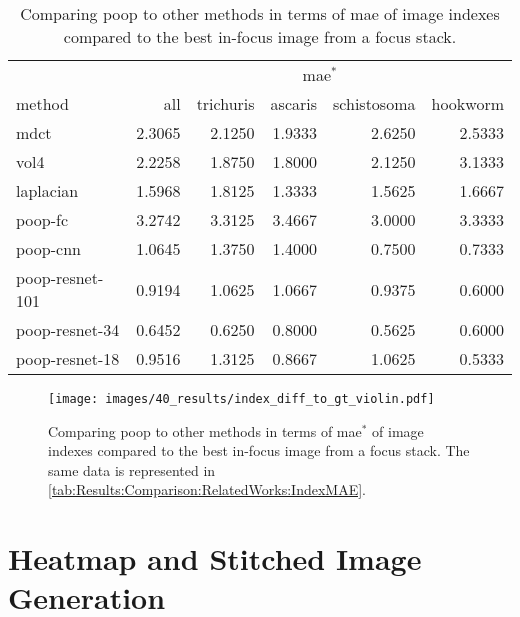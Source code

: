 \begin{table}
    \centering
    \caption{Comparing \acs{poop} to other methods in terms of \ac{mae} of image indexes compared to the best in-focus image from a focus stack.}
    \begin{tabular}{|l|rrrrr|}
        \hline
        \multicolumn{1}{|c}{} & \multicolumn{5}{|c|}{\ac{mae}$^*$} \\
        method & all & trichuris & ascaris & schistosoma & hookworm \\
        \hline
        \acs{mdct}      & 2.3065 & 2.1250 & 1.9333 & 2.6250 & 2.5333 \\
        \acs{vol4}      & 2.2258 & 1.8750 & 1.8000 & 2.1250 & 3.1333 \\
        \acs{laplacian} & 1.5968 & 1.8125 & 1.3333 & 1.5625 & 1.6667 \\
        \hline
        \acs{poop}-\acs{fc}  & 3.2742 & 3.3125 & 3.4667 & 3.0000 & 3.3333 \\
        \acs{poop}-\acs{cnn}            & 1.0645 & 1.3750 & 1.4000 & 0.7500 & 0.7333 \\
        \acs{poop}-\acs{resnet}-101      & 0.9194 & 1.0625 & 1.0667 & 0.9375 & 0.6000 \\
        \acs{poop}-\acs{resnet}-34       & 0.6452 & 0.6250 & 0.8000 & 0.5625 & 0.6000 \\
        \acs{poop}-\acs{resnet}-18       & 0.9516 & 1.3125 & 0.8667 & 1.0625 & 0.5333 \\
        \hline
    \end{tabular}
    \label{tab:Results:Comparison:RelatedWorks:IndexMAE}
\end{table}

\begin{figure}
    \centering
    \texttt{[image: images/40\_results/index\_diff\_to\_gt\_violin.pdf]}
    \caption{Comparing \acs{poop} to other methods in terms of \ac{mae}$^*$ of image indexes compared to the best in-focus image from a focus stack. The same data is represented in \autoref{tab:Results:Comparison:RelatedWorks:IndexMAE}.}
    \label{fig:Results:Comparison:RelatedWorks:IndexMAE}
\end{figure}


\section{Heatmap and Stitched Image Generation}
\label{sec:Results:HeatStiched}


